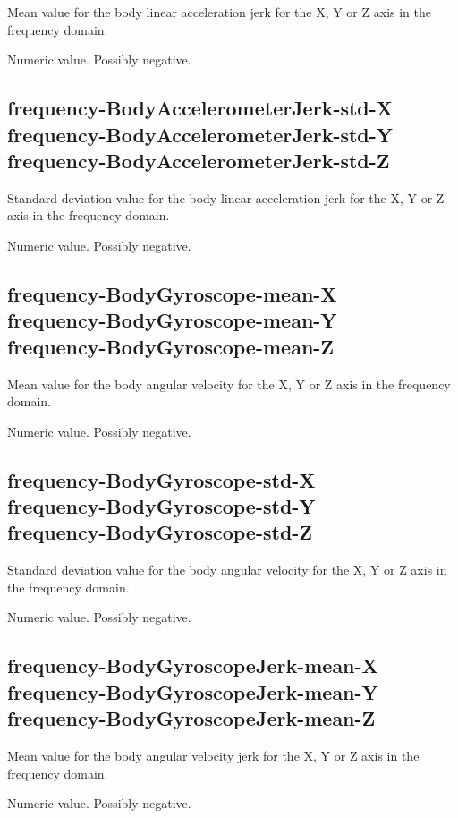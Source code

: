 \documentclass[a4paper,10pt]{report}
\begin{document}
Mean value for the body linear acceleration jerk for the X, Y or Z axis in the frequency domain.

Numeric value. Possibly negative.

\subsection*{frequency-BodyAccelerometerJerk-std-X\\frequency-BodyAccelerometerJerk-std-Y\\frequency-BodyAccelerometerJerk-std-Z} 

Standard deviation value for the body linear acceleration jerk for the X, Y or Z axis in the frequency domain.

Numeric value. Possibly negative.

\subsection*{frequency-BodyGyroscope-mean-X\\frequency-BodyGyroscope-mean-Y\\frequency-BodyGyroscope-mean-Z} 

Mean value for the body angular velocity for the X, Y or Z axis in the frequency domain.

Numeric value. Possibly negative.

\subsection*{frequency-BodyGyroscope-std-X\\frequency-BodyGyroscope-std-Y\\frequency-BodyGyroscope-std-Z} 

Standard deviation value for the body angular velocity for the X, Y or Z axis in the frequency domain.

Numeric value. Possibly negative.

\subsection*{frequency-BodyGyroscopeJerk-mean-X\\frequency-BodyGyroscopeJerk-mean-Y\\frequency-BodyGyroscopeJerk-mean-Z} 

Mean value for the body angular velocity jerk for the X, Y or Z axis in the frequency domain.

Numeric value. Possibly negative.
\end{document}
